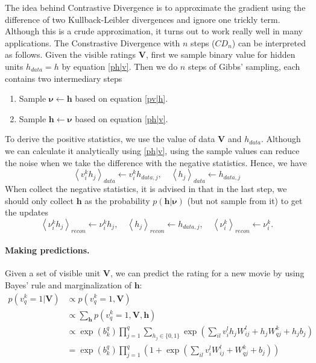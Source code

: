 \documentclass[bj, preprint]{imsart}
\newcommand{\cexp}[1]{\left<#1\right>}
\begin{document}
The idea behind Contrastive Divergence \citep{hinton2012practical} is to approximate the gradient using the difference of two Kullback-Leibler divergences and ignore one trickly term. Although this is a crude approximation, it turns out to work really well in many applications. The Constrastive Divergence with $n$ steps ($CD_n$) can be interpreted as follows. Given the visible ratings $\textbf{V}$, first we sample binary value for hidden units $h_{data} = h$ by equation \eqref{ph|v}. Then we do $n$ steps of Gibbs' sampling, each contains two intermediary steps
\begin{enumerate}
	\item Sample $\boldsymbol{\nu} \leftarrow \boldsymbol{h}$ based on equation \eqref{pv|h}.
	\item Sample $\boldsymbol{h} \leftarrow \boldsymbol{\nu}$ based on equation \eqref{ph|v}.
\end{enumerate}
To derive the positive statistics, we use the value of data $\textbf{V}$ and $h_{data}$. Although we can calculate it analytically using \eqref{ph|v}, using the sample values can reduce the noise when we take the difference with the negative statistics. Hence, we have
$$\cexp{v_i^k h_j}_{data} \leftarrow v_i^k h_{data, j}, \quad \cexp{h_j}_{data} \leftarrow h_{data, j}$$
When collect the negative statistics, it is advised in \cite{hinton2012practical} that in the last step, we should only collect $\boldsymbol{h}$ as the probability $p(\textbf{h}|\boldsymbol{\nu})$ (but not sample from it) to get the updates
$$\cexp{\nu_i^k h_j}_{recon} \leftarrow \nu_i^k h_{j},\quad \cexp{h_j}_{recon} \leftarrow h_{data, j},\quad \cexp{\nu_i^k}_{recon} \leftarrow \nu_i^k.$$

\paragraph{Making predictions.}\label{par:method.models.rbm.pred}

Given a set of visible unit $\textbf{V}$, we can predict the rating for a new movie by using Bayes' rule and marginalization of $\textbf{h}$:
\begin{align*}
p(v_q^{k} =  1 |\textbf{V}) & \propto p(v_q^{k} = 1, \textbf{V})  \\
&  \propto \sum_{\textbf{h}} p(v_q^{k} = 1, \textbf{V}, \textbf{h})\\
& \propto \exp(b_k^q) \prod_{j=1}^{q} \sum_{h_j\in \{0,1\}} \exp(\sum_{il} v_i^{l} h_j W_{ij}^{l} + h_j W_{qj}^{k} + h_jb_j)\\
& = \exp(b_k^q) \prod_{j=1}^{q} \left( 1 +  \exp(\sum_{il} v_i^{l} W_{ij}^{l} +  W_{qj}^{k} + b_j)\right)
\end{align*}
\end{document}
